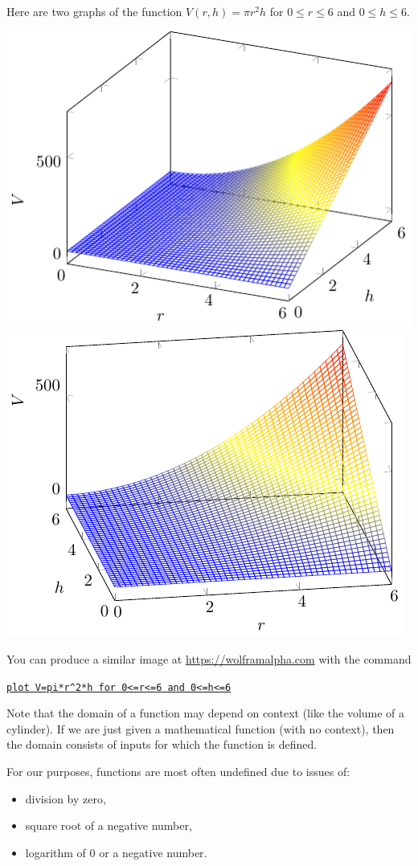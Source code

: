 Here are two graphs of the function $V(r,h)=\pi r^2h$ for $0\le r\le 6$ and $0\le h\le 6$.
\begin{center}

    \includegraphics[width=.4\textwidth]{tikz-pictures/section-9.1-pic1-first-3d-graph-v1.pdf}\hfill
    \includegraphics[width=.4\textwidth]{tikz-pictures/section-9.1-pic1-first-3d-graph-v2.pdf}\label{img:multivar-fn-graph}
\end{center}
You can produce a similar image at \url{https://wolframalpha.com} with the command 
\begin{center} 
    \href{https://www.wolframalpha.com/input/?i=plot+V%3Dpi*r%5E2*h+for+0%3C%3Dr%3C%3D6+and+0%3C%3Dh%3C%3D6}
    {\tt{plot V=pi*r\string^2*h for 0<=r<=6 and 0<=h<=6}}
\end{center}


\pagebreak 

Note that the domain of a function may depend on context (like the volume of a cylinder). If we are just given a mathematical function (with no context), then the domain consists of inputs for which the function is defined.

For our purposes, functions are most often undefined due to issues of:
\begin{itemize} 
    \item division by zero, 
    \item square root of a negative number, 
    \item logarithm of 0 or a negative number.
\end{itemize}

